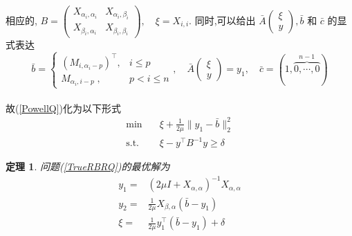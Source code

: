 \documentclass[a4paper, UTF8]{ctexart}				%
\newtheorem{theo}{\bf 定理}[section]			  %
\numberwithin{equation}{section}				%
\begin{document}
			\paragraph{}
				\quad 相应的,
				$
						B 
					=	\begin{pmatrix}
							X_{\alpha_i, \alpha_i} & X_{\alpha_i, \beta_i} \\
							X_{\beta_i, \alpha_i} & X_{\beta_i, \beta_i}
						\end{pmatrix} ,\quad 
						\xi
					=	X_{i, i}
				$.
				同时,可以给出 $\bar{A} \begin{pmatrix}\xi \\ y\end{pmatrix}, \bar{b}$ 和 $\bar{c}$ 的显式表达
				\begin{equation}\label{BigRBRCondition2}
						\bar{b}
					= 	\begin{cases}
							(M_{i,\alpha_i-p})^\top,&i\leq p\\
							M_{\alpha_i,i-p}\;,&p<i\leq n
						\end{cases}
						, \quad
						\bar{A} \begin{pmatrix} \xi \\ y \end{pmatrix}
					=	y_1
						, \quad
						\bar{c}
					=	(1, \overbrace{0, \cdots, 0}^{n - 1})
				\end{equation}

			\paragraph{}
				\quad 故(\ref{PowellQ})化为以下形式
				\begin{equation}
					\begin{split}\label{TrueRBRQ}
						\min \quad
							& \xi + \frac{1}{2\mu} \lVert{y_1 - \bar{b}}\rVert^2_2\\
						\text{s.t.} \quad
							& \xi - y^\top B^{-1} y \geq \delta
					\end{split}
				\end{equation}

			\begin{theo}\label{rbrTheo}
				问题(\ref{TrueRBRQ})的最优解为
				\begin{equation}
					\begin{split}\label{TrueRBRA}
						y_1 = & (2 \mu I + X_{\alpha, \alpha})^{-1} X_{\alpha, \alpha}\\
						y_2 = & \frac{1}{2 \mu} X_{\beta, \alpha} (\bar{b} - y_1)\\
						\xi = & \frac{1}{2 \mu} y_1^\top (\bar{b} - y_1) + \delta
					\end{split}
				\end{equation}
			\end{theo}
\end{document}
